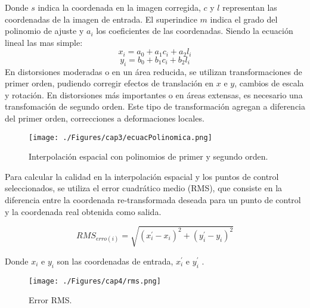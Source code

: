 Donde $ s $ indica la coordenada en la imagen corregida, $ c $ y $ l $ representan las coordenadas de la imagen de entrada. El superindice $ m $ indica el grado del polinomio de ajuste y $ a_{i} $ los coeficientes de las coordenadas. Siendo la ecuaci\'on lineal las mas simple:
	\begin{equation}
	x_{i} = a_{0}+a_{1}c_{i}+a_{2}l_{i}
	\end{equation} 
		\begin{equation}
		y_{i} = b_{0}+b_{1}c_{i}+b_{2}l_{i}
		\end{equation} 
En distorsiones moderadas o en un \'area reducida, se utilizan transformaciones de primer orden, pudiendo corregir efectos de translaci\'on en $ x $ e $ y $, cambios de escala y rotaci\'on.
En distorsiones m\'as importantes o en \'areas extensas, es necesario una transfomaci\'on de segundo orden. Este tipo de transformaci\'on agregan a diferencia del primer orden, correcciones a deformaciones locales.
    \begin{figure}[H]
    	\centering
    	\texttt{[image: ./Figures/cap3/ecuacPolinomica.png]}
    	\caption{Interpolaci\'on espacial con polinomios de primer y segundo orden.}
    	\label{fig:intPolEcua}
    \end{figure}
 Para calcular la calidad en la interpolaci\'on espacial y los puntos de control seleccionados, se utiliza el error cuadrático medio (RMS), que consiste en la diferencia entre la coordenada re-transformada deseada para un punto de control y la coordenada real obtenida como salida.

 \begin{equation}
 RMS_{erro(i)} = \sqrt{(x_{i}^{'}-x_{i})^{2}+(y_{i}^{'}-y_{i})^{2}}
 \end{equation} 
 
 Donde $ x_{i} $ e $ y_{i} $ son las coordenadas de entrada, $ x_{i}^{'} $ e $ y_{i}^{'} $ .
 
     \begin{figure}[H]
     	\centering
     	\texttt{[image: ./Figures/cap4/rms.png]}
     	\caption{Error RMS.}
     	\label{fig:rms}
     \end{figure}



